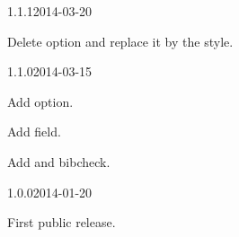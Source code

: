 \documentclass{ltxdockit}[2011/03/25]
\begin{document}
\begin{changelog}
\begin{release}{1.1.1}{2014-03-20}
	\item Delete  option and replace it by the  style. 
\end{release}

\begin{release}{1.1.0}{2014-03-15}
\item Add  option.
\item Add  field.
\item Add  and  bibcheck. 
\end{release}

\begin{release}{1.0.0}{2014-01-20}
\item First public release.
\end{release}
\end{changelog}
\end{document}
